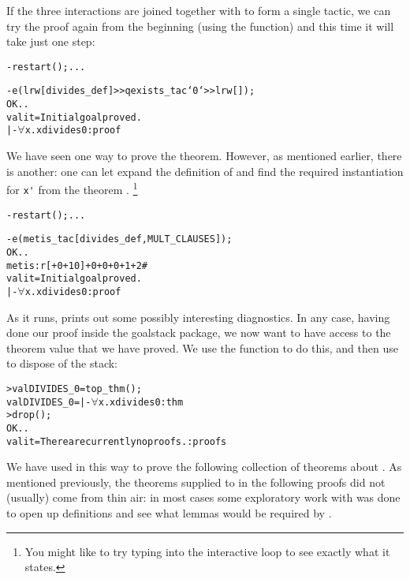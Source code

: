 If the three interactions are joined together with \ml{\gt\gt} to form a single tactic, we can try the proof again from the beginning (using the  function) and this time it will take just one step:
\begin{session}
\begin{alltt}
- restart(); ...

- e (lrw[divides_def] >> qexists_tac `0` >> lrw[]);
OK..
val it = Initial goal proved.
|- \(\forall\)x. x divides 0: proof
\end{alltt}
\end{session}
We have seen one way to prove the theorem.
However, as mentioned
earlier, there is another: one can let  expand the definition of  and find the required instantiation for \verb+x'+ from the theorem .%
\footnote{You might
  like to try typing  into the interactive loop
  to see exactly what it states.}
\begin{session}
\begin{alltt}
- restart();   ...

- e (metis_tac [divides_def, MULT_CLAUSES]);
OK..
metis: r[+0+10]+0+0+0+1+2#
val it = Initial goal proved.
|- \(\forall\)x. x divides 0: proof
\end{alltt}
\end{session}
As it runs,  prints out some possibly interesting diagnostics.
In any case, having done our proof inside the goalstack package, we now want to have access to the theorem value that we have proved.
We use the  function to do this, and then use  to dispose of the stack:
\begin{session}
\begin{alltt}
> val DIVIDES_0 = top_thm();
val DIVIDES_0 = |- \(\forall\)x. x divides 0: thm
> drop();
OK..
val it = There are currently no proofs.: proofs
\end{alltt}
\end{session}

We have used  in this way to prove the following collection of theorems about .
As mentioned previously, the theorems supplied to  in the following proofs did not (usually) come from thin air: in most cases some exploratory work with  was done to open up definitions and see what lemmas would be required by .

